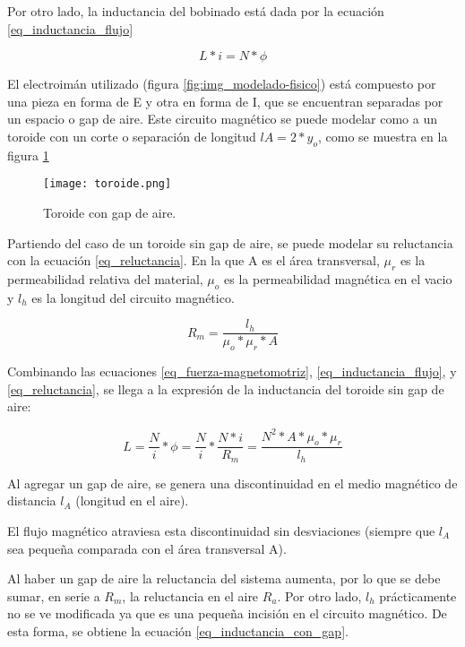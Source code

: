 \noindent Por otro lado, la inductancia del bobinado está dada por la ecuación \ref{eq_inductancia_flujo}

\begin{equation} \label{eq_inductancia_flujo}
	L*i=N*\phi
\end{equation}


\noindent El electroimán utilizado (figura \ref{fig:img_modelado-fisico}) está compuesto por una pieza en forma de E y otra en forma de I, que se encuentran separadas por un espacio o gap de aire. Este circuito magnético se puede modelar como a un toroide con un corte o separación  de longitud $lA=2*y_{o}$, como se muestra en la figura \ref{fig:img_toroide}

\begin{figure}[H]
	\centering
	\texttt{[image: toroide.png]}
	\caption{Toroide con gap de aire.}
	\label{fig:img_toroide}
\end{figure}

\noindent Partiendo del caso de un toroide sin gap de aire, se puede modelar su reluctancia con la ecuación \ref{eq_reluctancia}. En la que A es el área transversal, $\mu_{r}$ es la permeabilidad relativa del material, $\mu_{o}$ es la permeabilidad magnética en el vacio y $l_{h}$ es la longitud del circuito magnético. 

\begin{equation}\label{eq_reluctancia}
	R_{m}=\frac{l_{h}}{\mu_{o}*\mu_{r}*A}
\end{equation}

\noindent Combinando las ecuaciones \ref{eq_fuerza-magnetomotriz}, \ref{eq_inductancia_flujo}, y \ref{eq_reluctancia}, se llega a la expresión de la inductancia del toroide sin gap de aire:

\begin{equation}\label{eq_inductancia}
	L=\frac{N}{i}*\phi=\frac{N}{i}*\frac{N*i}{R_{m}}=\frac{N^	{2}*A*\mu_{o}*\mu_{r}}{l_{h}}
\end{equation}


\noindent Al agregar un gap de aire, se genera una discontinuidad en el medio magnético de distancia $l_{A}$ (longitud en el aire).

\noindent El flujo magnético atraviesa esta discontinuidad sin desviaciones (siempre que $l_{A}$ sea pequeña comparada con el área transversal A).

\noindent Al haber un gap de aire la reluctancia del sistema aumenta, por lo que se debe sumar, en serie a $R_{m}$, la reluctancia en el aire $R_{a}$. Por otro lado, $l_{h}$ prácticamente no se ve modificada ya que es una pequeña incisión en el circuito magnético. De esta forma, se obtiene la ecuación \ref{eq_inductancia_con_gap}.

